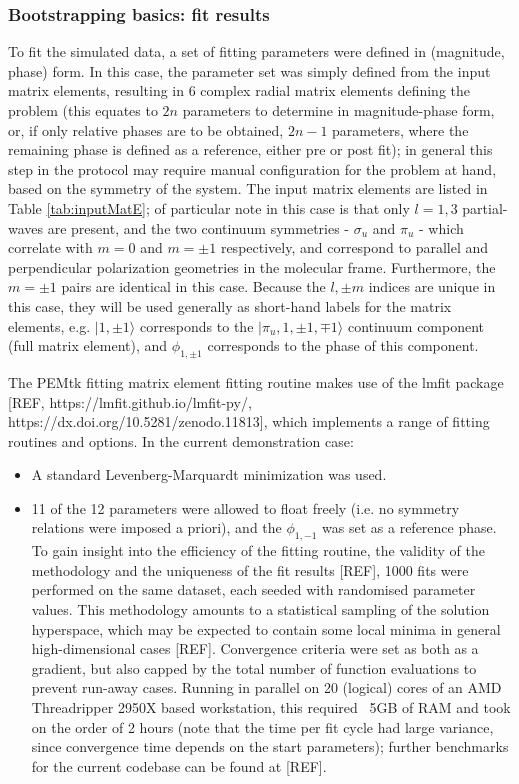 \subsubsection{Bootstrapping basics: fit results}

To fit the simulated data, a set of fitting parameters were defined in (magnitude, phase) form. In this case, the parameter set was simply defined from the input matrix elements, resulting in 6 complex radial matrix elements defining the problem (this equates to $2n$ parameters to determine in magnitude-phase form, or, if only relative phases are to be obtained, $2n-1$ parameters, where the remaining phase is defined as a reference, either pre or post fit); in general this step in the protocol may require manual configuration for the problem at hand, based on the symmetry of the system. The input matrix elements are listed in Table \ref{tab:inputMatE}; of particular note in this case is that only $l=1,3$ partial-waves are present, and the two continuum symmetries - $\sigma_u$ and $\pi_u$ - which correlate with $m=0$ and $m=\pm1$ respectively, and correspond to parallel and perpendicular polarization geometries in the molecular frame. Furthermore, the $m=\pm1$ pairs are identical in this case. Because the $l,\pm m$ indices are unique in this case, they will be used generally as short-hand labels for the matrix elements, e.g. $|1,\pm1\rangle$ corresponds to the $|\pi_u,1,\pm 1,\mp 1 \rangle$ continuum component (full matrix element), and $\phi_{1,\pm1}$ corresponds to the phase of this component.

The PEMtk fitting matrix element fitting routine makes use of the lmfit package [REF, https://lmfit.github.io/lmfit-py/, https://dx.doi.org/10.5281/zenodo.11813], which implements a range of fitting routines and options. In the current demonstration case:

\begin{itemize}
\item A standard Levenberg-Marquardt minimization was used.
\item 11 of the 12 parameters were allowed to float freely (i.e. no symmetry relations were imposed a priori), and the $\phi_{1,-1}$ was set as a reference phase. To gain insight into the efficiency of the fitting routine, the validity of the methodology and the uniqueness of the fit results [REF], 1000 fits were performed on the same dataset, each seeded with randomised parameter values. This methodology amounts to a statistical sampling of the solution hyperspace, which may be expected to contain some local minima in general high-dimensional cases [REF]. Convergence criteria were set as both as a gradient, but also capped by the total number of function evaluations to prevent run-away cases. Running in parallel on 20 (logical) cores of an AMD Threadripper 2950X based workstation, this required ~5GB of RAM and took on the order of 2 hours (note that the time per fit cycle had large variance, since convergence time depends on the start parameters); further benchmarks for the current codebase can be found at [REF].

\end{itemize}


